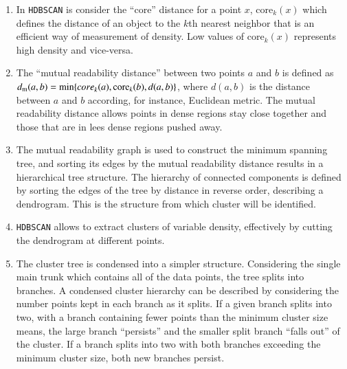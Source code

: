 \documentclass[fleqn,usenatbib]{mnras}
\begin{document}
\begin{enumerate}
\item In \texttt{HDBSCAN} is consider the ``core'' distance  for a point $x$, core$_k(x)$
  which defines the distance of an object to the $k$th nearest neighbor that is an
  efficient way of measurement of density. Low values of core$_k(x)$ represents high
  density and vice-versa.

\item The ``mutual readability distance'' between two points $a$ and $b$ is defined as
  $d_{\mathrm{m}}(a, b) = \mathrm{min}{\mathrm\{core}_k(a), \mathrm{core}_k(b), d(a, b)\}$,
  where $d(a, b)$ is the distance between $a$ and $b$ according, for instance,
  Euclidean metric. The mutual readability distance allows points in dense regions
  stay close together and those that are in lees dense regions pushed away.

\item The mutual readability graph is used to construct the minimum spanning tree,
  and sorting its edges by the mutual readability distance results in a
  hierarchical tree structure. The hierarchy of connected components is
  defined by sorting the edges of the tree by distance in reverse order,
  describing a dendrogram. This is the structure from which cluster will
  be identified.

\item \texttt{HDBSCAN} allows to extract clusters of variable density, effectively
  by cutting the dendrogram at different points.

\item The cluster tree is condensed into a simpler structure. Considering the single
  main trunk which contains all of the data points, the tree splits into branches.
  A condensed cluster hierarchy can be described by considering the number points
  kept in each branch as it splits. If a given branch splits into two, with a branch
  containing fewer points than the minimum cluster size means, the large branch
  ``persists'' and the smaller split branch ``falls out'' of the  cluster. If
  a branch splits into two with both branches exceeding the minimum cluster size,
  both new branches persist.


\end{enumerate}
\end{document}
